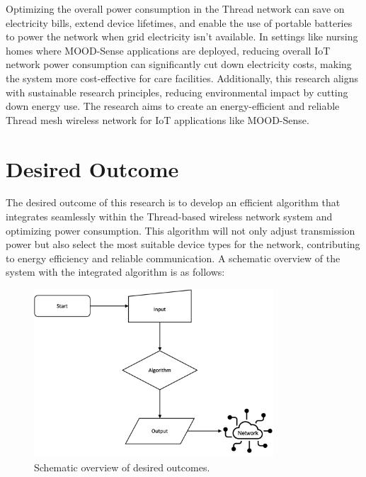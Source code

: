 Optimizing the overall power consumption in the Thread network can save on electricity bills, extend device lifetimes, and enable the use of portable batteries to power the network when grid electricity isn't available. In settings like nursing homes where MOOD-Sense applications are deployed, reducing overall \gls{IoT} network power consumption can significantly cut down electricity costs, making the system more cost-effective for care facilities. Additionally, this research aligns with sustainable research principles, reducing environmental impact by cutting down energy use. The research aims to create an energy-efficient and reliable Thread mesh wireless network for \gls{IoT} applications like MOOD-Sense.


\section{Desired Outcome}\label{sec:desired_outcome}
The desired outcome of this research is to develop an efficient algorithm that integrates seamlessly within the Thread-based wireless network system and optimizing power consumption. This algorithm will not only adjust transmission power but also select the most suitable device types for the network, contributing to energy efficiency and reliable communication. A schematic overview of the system with the integrated algorithm is as follows:

\begin{figure}[H]
    \centering
    \includegraphics[width=0.8\textwidth]{images/rationale/desired-outcomes.png}
    \caption{Schematic overview of desired outcomes.}
    \label{fig:rationale_desired_outcomes}
\end{figure}

